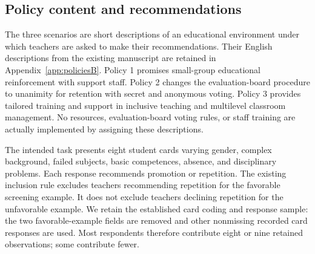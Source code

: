 \subsection{Policy content and recommendations}
The three scenarios are short descriptions of an educational environment under which teachers are asked to make their recommendations. Their English descriptions from the existing manuscript are retained in Appendix~\ref{app:policiesB}. Policy 1 promises small-group educational reinforcement with support staff. Policy 2 changes the evaluation-board procedure to unanimity for retention with secret and anonymous voting. Policy 3 provides tailored training and support in inclusive teaching and multilevel classroom management. No resources, evaluation-board voting rules, or staff training are actually implemented by assigning these descriptions.

The intended task presents eight student cards varying gender, complex background, failed subjects, basic competences, absence, and disciplinary problems. Each response recommends promotion or repetition. The existing inclusion rule excludes teachers recommending repetition for the favorable screening example. It does not exclude teachers declining repetition for the unfavorable example. We retain the established card coding and response sample: the two favorable-example fields are removed and other nonmissing recorded card responses are used. Most respondents therefore contribute eight or nine retained observations; some contribute fewer.


